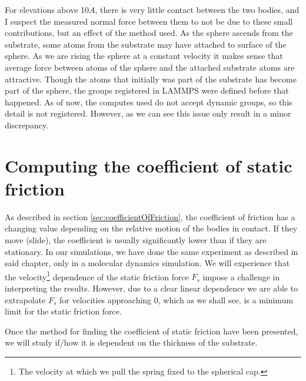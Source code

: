 \documentclass[twoside,english]{uiofysmaster}
\begin{document}
For elevations above 10$\mathring{A}$, there is very little contact between the two bodies, and I suspect the measured normal force between them to not be due to these small contributions, but an effect of the method used. 
As the sphere ascends from the substrate, some atoms from the substrate may have attached to surface of the sphere. 
As we are rising the sphere at a constant velocity it makes sense that average force between atoms of the sphere and the attached substrate atoms are attractive. 
Though the atoms that initially was part of the substrate has become part of the sphere, the groups registered in LAMMPS were defined before that happened. 
As of now, the computes used do not accept dynamic groups, so this detail is not registered. 
However, as we can see this issue only result in a minor discrepancy. 





















\chapter{Computing the coefficient of static friction} \label{chp:coefficientOfFriction}
As described in section \ref{sec:coefficientOfFriction}, the coefficient of friction has a changing value depending on the relative motion of the bodies in contact. 
If they move (slide), the coefficient is usually significantly lower than if they are stationary. 
In our simulations, we have done the same experiment as described in said chapter, only in a molecular dynamics simulation. 
We will experience that the velocity\footnote{The velocity at which we pull the spring fixed to the spherical cap.} dependence of the static friction force $F_s$ impose a challenge in interpreting the results.
However, due to a clear linear dependence we are able to extrapolate $F_s$ for velocities approaching 0, which as we shall see, is a minimum limit for the static friction force. 

Once the method for finding the coefficient of static friction have been presented, we will study if/how it is dependent on the thickness of the substrate.
\end{document}

